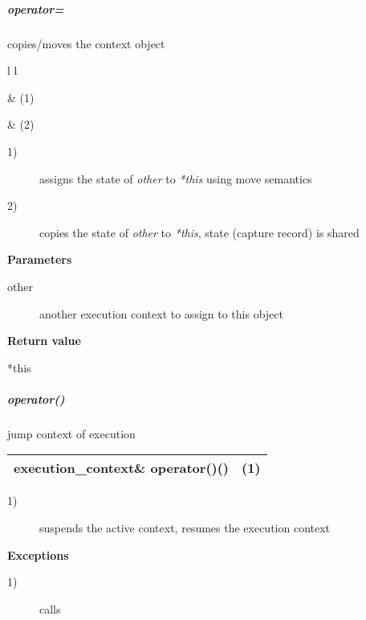 \subparagraph*{operator=}
copies/moves the context object\\

\begin{tabular}{ l l }
    \midrule

     & (1)\\

    \midrule

     & (2)\\

    \midrule
\end{tabular}

\begin{description}
    \item[1)] assigns the state of \emph{other} to \emph{*this} using move semantics
    \item[2)] copies the state of \emph{other} to \emph{*this}, state (capture
              record) is shared
\end{description}

{\bfseries Parameters}
\begin{description}
    \item[other]   another execution context to assign to this object\\
\end{description}

{\bfseries Return value}
\begin{description}
    \item[*this]
\end{description}

\subparagraph*{operator()}
jump context of execution\\

\begin{tabular}{ l l }
    \midrule

    {\ttfamily\small\color{black}execution\_context\& {\color{blue}operator}()()} & (1)\\

    \midrule
\end{tabular}

\begin{description}
    \item[1)] suspends the active context, resumes the execution context\\
\end{description}

{\bfseries Exceptions}
\begin{description}
    \item[1)] calls \\
\end{description}


